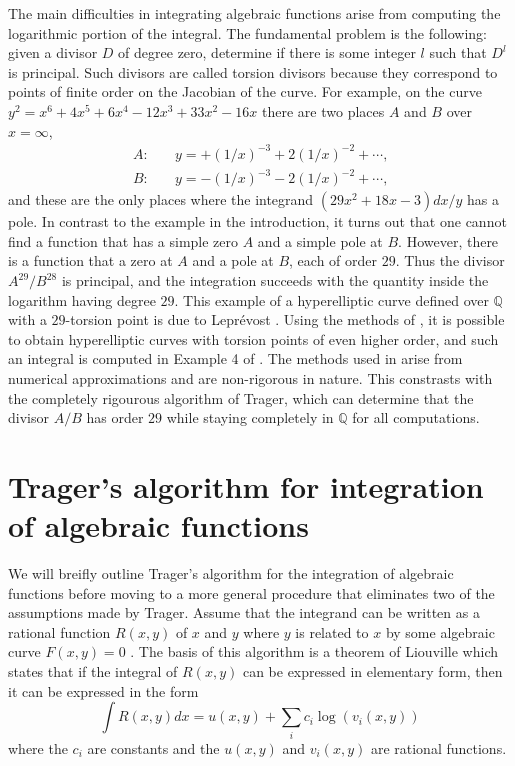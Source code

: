 \documentclass[12pt,reqno]{amsart}
\numberwithin{equation}{section}
\newcommand{\bbQ}[0]  { \mathbb{Q}}
\begin{document}
The main difficulties in integrating algebraic functions arise from computing the logarithmic portion of the integral. The fundamental problem is the following: given a divisor $D$ of degree zero, determine if there is some integer $l$ such that $D^l$ is principal. Such divisors are called torsion divisors because they correspond to points of finite order on the Jacobian of the curve. For example, on the curve $y^2=x^6+4 x^5+6 x^4-12 x^3+33 x^2-16 x$ there are two places $A$ and $B$ over $x=\infty$,
\begin{align*}
 A: & \quad  y= +(1/x)^{-3} + 2(1/x)^{-2} + \cdots\text{,}\\
 B: & \quad y= -(1/x)^{-3} - 2(1/x)^{-2} + \cdots\text{,}
\end{align*}
and these are the only places where the integrand $(29 x^2+18 x-3)d x/y$ has a pole. In contrast to the example in the introduction, it turns out that one cannot find a function that has a simple zero $A$ and a simple pole at $B$. However, there is a function that a zero at $A$ and a pole at $B$, each of order $29$. Thus the divisor $A^{29}/B^{28}$ is principal, and the integration succeeds with the quantity inside the logarithm having degree $29$. This example of a hyperelliptic curve defined over $\bbQ$ with a $29$-torsion point is due to Lepr\'evost \cite{leprevost}. Using the methods of \cite{flynn}, it is possible to obtain hyperelliptic curves with torsion points of even higher order, and such an integral is computed in Example 4 of \cite{compabel}. The methods used in \cite{compabel} arise from numerical approximations and are non-rigorous in nature. This constrasts with the completely rigourous algorithm of Trager, which can determine that the divisor $A/B$ has order $29$ while staying completely in $\bbQ$ for all computations.


\section{Trager's algorithm for integration of algebraic functions}
\label{section_trager}
We will breifly outline Trager's algorithm for the integration of algebraic functions before moving to a more general procedure that eliminates two of the assumptions made by Trager. Assume that the integrand can be written as a rational function $R(x,y)$ of $x$ and $y$ where $y$ is related to $x$ by some algebraic curve $F(x,y)=0$ . The basis of this algorithm is a theorem of Liouville which states that if the integral of $R(x,y)$ can be expressed in elementary form, then it can be expressed in the form
\begin{equation}
 \int R(x,y) dx = u(x,y) + \sum_{i} c_i \log(v_i(x,y))
\end{equation}
where the $c_i$ are constants and the $u(x,y)$ and $v_i(x,y)$ are rational functions.
\end{document}
